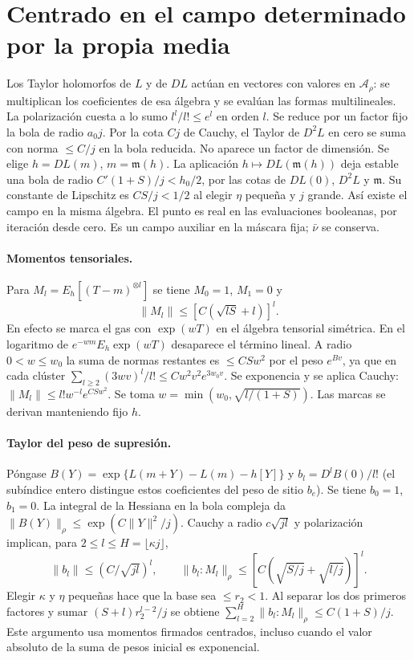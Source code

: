 \section{Centrado en el campo determinado por la propia media}
Los Taylor holomorfos de $L$ y de $DL$ actúan en vectores con valores en $\mathcal A_\rho$:
se multiplican los coeficientes de esa álgebra y se evalúan las formas multilineales.
La polarización cuesta a lo sumo $l^l/l!\le e^l$ en orden $l$. Se reduce por un factor
fijo la bola de radio $a_0j$. Por la cota $Cj$ de Cauchy, el Taylor de $D^2L$ en cero
se suma con norma $\le C/j$ en la bola reducida. No aparece un factor de dimensión.
Se elige $h=DL(m)$, $m=\mathfrak m(h)$.
La aplicación $h\mapsto DL(\mathfrak m(h))$ deja estable una bola de radio
$C'(1+S)/j<h_0/2$, por las cotas de $DL(0)$, $D^2L$ y $\mathfrak m$.
Su constante de Lipschitz es $CS/j<1/2$ al elegir $\eta$ pequeña y $j$ grande.
Así existe el campo en la misma álgebra. El punto es real en las evaluaciones booleanas,
por iteración desde cero. Es un campo auxiliar en la máscara fija; $\bar\nu$ se conserva.
\paragraph{Momentos tensoriales.}
Para $M_l=E_h[(T-m)^{\otimes l}]$ se tiene $M_0=1$, $M_1=0$ y
\[
 \|M_l\|\le [C(\sqrt{lS}+l)]^l .
\]
En efecto se marca el gas con $\exp(wT)$ en el álgebra tensorial simétrica.
En el logaritmo de $e^{-wm}E_h\exp(wT)$ desaparece el término lineal. A radio
$0<w\le w_0$ la suma de normas restantes es $\le CS w^2$ por el peso $e^{Bv}$,
ya que en cada clúster $\sum_{l\ge2}(3wv)^l/l!\le Cw^2 v^2 e^{3w_0v}$.
Se exponencia y se aplica Cauchy: $\|M_l\|\le l!w^{-l}e^{CSw^2}$.
Se toma $w=\min(w_0,\sqrt{l/(1+S)})$. Las marcas se derivan manteniendo fijo $h$.
\paragraph{Taylor del peso de supresión.}
Póngase $B(Y)=\exp\{L(m+Y)-L(m)-h[Y]\}$ y $b_l=D^lB(0)/l!$ (el subíndice entero
distingue estos coeficientes del peso de sitio $b_e$). Se tiene $b_0=1$, $b_1=0$.
La integral de la Hessiana en la bola compleja da $\|B(Y)\|_\rho\le\exp(C\|Y\|^2/j)$.
Cauchy a radio $c\sqrt{jl}$ y polarización implican, para $2\le l\le H=\lfloor\kappa j\rfloor$,
\[
 \|b_l\|\le(C/\sqrt{jl})^l,\qquad
 \|b_l:M_l\|_\rho\le [C(\sqrt{S/j}+\sqrt{l/j})]^l .
\]
Elegir $\kappa$ y $\eta$ pequeñas hace que la base sea $\le r_2<1$. Al separar los dos
primeros factores y sumar $(S+l)r_2^{l-2}/j$ se obtiene
$\sum_{l=2}^H\|b_l:M_l\|_\rho\le C(1+S)/j$. Este argumento usa momentos firmados
centrados, incluso cuando el valor absoluto de la suma de pesos inicial es exponencial.
